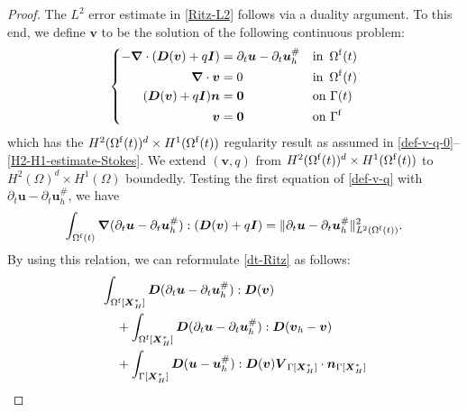 \documentclass[11pt,reqno]{amsart}
\theoremstyle{definition}
\theoremstyle{plain}
\numberwithin{theorem}{section}
\numberwithin{proposition}{section}
\numberwithin{lemma}{section}
\numberwithin{equation}{section}
\newcommand{\bs}[1]{\boldsymbol{#1}}
\newcommand{\uu}[1]  {{\bs{#1}} }
\newcommand{\grad}   { \uu{\nabla}    }
\newcommand{\bv}{{\bs v}}
\def\b{\color{blue}}
\renewcommand{\(}{\bigl(}
\renewcommand{\)}{\bigr)}
\newcommand{\MO}[1]{{\color{magenta} MO:  #1}}
\begin{document}
\begin{proof}
The $L^2$ error estimate in \eqref{Ritz-L2} follows via a duality argument. To this end, we define ${\bs v}$ to be the solution of the following continuous problem: 
\begin{align}\label{def-v-q}
\left\{
\begin{aligned}
-\grad\cdot({\bs D}(\bv) + q{\bs I}) &= \partial_t{\bs u}-\partial_t{\bs u}_h^\# &&\mbox{in}\,\,\,\Omega^{\rm f}(t) \\
\grad\cdot{\bs v}&=0 &&\mbox{in}\,\,\,\Omega^{\rm f}(t) \\
({\bs D}(\bv) + q{\bs I}){\bs n} &= \bs 0 &&\mbox{on}\,\,\Gamma(t) \\
{\bs v}&= \bs 0 &&\mbox{on}\,\,\Gamma^{\rm f} \\
\end{aligned}
\right.
\end{align}
which has the $H^2(\Omega^{\rm f}(t))^d\times H^1(\Omega^{\rm f}(t))$ regularity result as assumed in \eqref{def-v-q-0}--\eqref{H2-H1-estimate-Stokes}. We extend $({\bs v},q)$ from $H^2(\Omega^{\rm f}(t))^d\times H^1(\Omega^{\rm f}(t))$ to $H^2(\Omega)^d\times H^1(\Omega)$ boundedly. 
Testing the first equation of \eqref{def-v-q} with $\partial_t{\bs u}-\partial_t{\bs u}_h^\#$, we have
\begin{align}\label{dt-u-Ritz-L22}
\int_{\Omega^{\rm f}(t)} \grad(\partial_t{\bs u}-\partial_t{\bs u}_h^\#) : ({\bs D}(\bv) + q{\bs I}) 
= \|\partial_t{\bs u}-\partial_t{\bs u}_h^\#\|_{L^2(\Omega^{\rm f}(t))}^2 .
\end{align}
By using this relation, we can reformulate \eqref{dt-Ritz} as follows: 
\begin{subequations}\label{dt-Ritz-rf}
\begin{align}
& \int_{\Omega^{\rm f}[\bs X_H^*]} {\bs D}(\partial_t{\bs u}-\partial_t{\bs u}_h^\#): {\bs D}({\bs v}) \label{dt-Ritz-a}\\
&\quad\, 
+ \int_{\Omega^{\rm f}[\bs X_H^*]} {\bs D}(\partial_t{\bs u}-\partial_t{\bs u}_h^\#): {\bs D}({\bs v}_h-{\bs v}) \label{dt-Ritz-b}\\
&\quad\, 
+ \int_{\Gamma[\bs X_H^*]} {\bs D}({\bs u}-{\bs u}_h^\#): {\bs D}({\bs v}) {\bs V}_{\Gamma[\bs X_H^*]}\cdot{\bs n}_{\Gamma[\bs X_H^*]} \label{dt-Ritz-c}\\

\end{align}
\end{subequations}
\end{proof}
\end{document}
